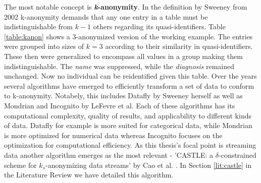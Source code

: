 The most notable concept is \textbf{\textit{k}-anonymity}. In the definition by Sweeney from 2002 \cite{sweeney2002kanonymity} k-anonymity demands that any one entry in a table must be indistinguishable from $k - 1$ others regarding its quasi-identifiers. Table \ref{table:kanon} shows a 3-anonymized version of the working example. The entries were grouped into sizes of $k=3$ according to their similarity in quasi-identifiers. These then were generalized to encompass all values in a group making them indistinguishable. The \textit{name} was suppressed, while the \textit{diagnosis} remained unchanged. Now no individual can be reidentified given this table. Over the years several algorithms have emerged to efficiently transform a set of data to conform to k-anonymity. Notabely, this includes Datafly by Sweeney herself \cite{sweeney1997datafly} as well as Mondrian \cite{lefevre2006mondrian} and Incognito \cite{lefevre2005incognito} by LeFevre et al. Each of these algorithms has its computational complexity, quality of results, and applicability to different kinds of data. Datafly for example is more suited for categorical data, while Mondrian is more optimized for numerical data whereas Incognito focuses on the optimization for computational efficiency. As this thesis's focal point is streaming data another algorithm emerges as the most relevant - 'CASTLE: a $\delta$-constrained scheme for $k_s$-anonymizing data streams' by Cao et al. \cite{Cao2008}. In Section \ref{lit:castle} in the Literature Review we have detailed this algorithm. 

